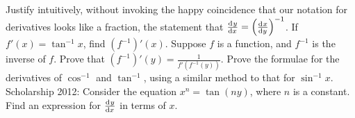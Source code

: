 \begin{questions}
  \questioE Justify intuitively, without invoking the happy coincidence that our notation for derivatives looks like a fraction, the
            statement that $ \od{y}{x} = \left(\od{x}{y}\right)^{-1} $.
  \questioE If $ f'(x) = \tan^{-1} x $, find $ (f^{-1})'(x) $.
  \questioE Suppose $ f $ is a function, and $ f^{-1} $ is the inverse of $ f $. Prove that $ (f^{-1})'(y) = \frac{1}{f'(f^{-1}(y))} $.
  \questioS Prove the formulae for the derivatives of $ \cos^{-1} $ and $ \tan^{-1} $, using a similar method to that for $ \sin^{-1} x $.
  \questioS Scholarship 2012: Consider the equation $ x^n = \tan(ny) $, where $ n $ is a constant. Find an expression
            for $ \od{y}{x} $ in terms of $ x $.
\end{questions}

